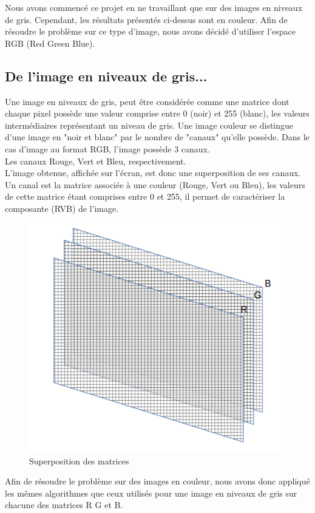Nous avons commencé ce projet en ne travaillant que sur des images en niveaux de gris. Cependant, les résultats présentés ci-dessus sont en couleur. Afin de résoudre le problème sur ce type d'image, nous avons décidé d'utiliser l'espace RGB (Red Green Blue).
\subsection{De l'image en niveaux de gris...}
Une image  en niveaux de gris, peut être considérée comme une matrice dont chaque pixel possède une valeur comprise entre 0 (noir) et 255 (blanc), les valeurs intermédiaires représentant un niveau de gris. Une image couleur se distingue d'une image en "noir et blanc" par le nombre de "canaux" qu'elle possède. Dans le cas d'image au format RGB, l'image possède 3 canaux.\\ Les canaux Rouge, Vert et Bleu, respectivement.\\
L'image obtenue, affichée sur l'écran, est donc une superposition de ses canaux.
 Un canal est la matrice associée à une couleur (Rouge, Vert ou Bleu), les valeurs de cette matrice étant comprises entre 0 et 255, il permet de caractériser la composante (RVB) de l'image. \\ 
 \begin{figure}[H]
 \centering
 \includegraphics[scale=0.2]{Images/rgb.png}
 \caption{Superposition des matrices}
 \end{figure}
Afin de résoudre le problème sur des images en couleur, nous avons donc appliqué les mêmes algorithmes que ceux utilisés pour une image en niveaux de gris sur chacune des matrices R G et B.
